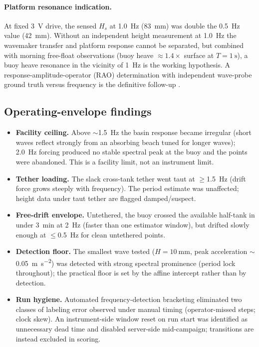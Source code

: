 \documentclass[11pt,a4paper]{article}
\begin{document}
\paragraph{Platform resonance indication.} At fixed \SI{3}{\volt} drive, the
sensed $H_s$ at \SI{1.0}{\hertz} (\SI{83}{\milli\meter}) was double the
\SI{0.5}{\hertz} value (\SI{42}{\milli\meter}). Without an independent height
measurement at \SI{1.0}{\hertz} the wavemaker transfer and platform response
cannot be separated, but combined with morning free-float observations (buoy
heave $\approx 1.4\times$ surface at $T = \SI{1}{\second}$), a buoy heave
resonance in the vicinity of \SI{1}{\hertz} is the working hypothesis. A
response-amplitude-operator (RAO) determination with independent wave-probe
ground truth versus frequency is the definitive follow-up
\citep{raghukumar2019}.

\subsection{Operating-envelope findings}
\label{sec:envelope}
\begin{itemize}
  \item \textbf{Facility ceiling.} Above $\sim$\SI{1.5}{\hertz} the basin
        response became irregular (short waves reflect strongly from an
        absorbing beach tuned for longer waves); \SI{2.0}{\hertz} forcing
        produced no stable spectral peak at the buoy and the points were
        abandoned. This is a facility limit, not an instrument limit.
  \item \textbf{Tether loading.} The slack cross-tank tether went taut at
        $\ge$\SI{1.5}{\hertz} (drift force grows steeply with frequency).
        The period estimate was unaffected; height data under taut tether are
        flagged damped/suspect.
  \item \textbf{Free-drift envelope.} Untethered, the buoy crossed the
        available half-tank in under \SI{3}{\minute} at \SI{2}{\hertz}
        (faster than one estimator window), but drifted slowly enough at
        $\le$\SI{0.5}{\hertz} for clean untethered points.
  \item \textbf{Detection floor.} The smallest wave tested
        ($H = \SI{10}{\milli\meter}$, peak acceleration
        $\sim$\SI{0.05}{\meter\per\second\squared}) was detected with strong
        spectral prominence (period lock throughout); the practical floor is
        set by the affine intercept rather than by detection.
  \item \textbf{Run hygiene.} Automated frequency-detection bracketing
        eliminated two classes of labeling error observed under manual
        timing (operator-missed steps; clock skew). An instrument-side
        window reset on run start was identified as unnecessary dead time
        and disabled server-side mid-campaign; transitions are instead
        excluded in scoring.
\end{itemize}
\end{document}
